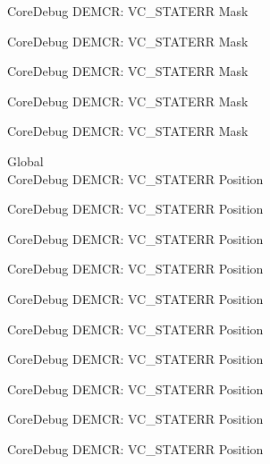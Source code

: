 \begin{DoxyRefList}
\label{deprecated__deprecated000884}%
%
Core\+Debug DEMCR\+: VC\+\_\+\+STATERR Mask 

\label{deprecated__deprecated001026}%
%
Core\+Debug DEMCR\+: VC\+\_\+\+STATERR Mask 

\label{deprecated__deprecated001102}%
%
Core\+Debug DEMCR\+: VC\+\_\+\+STATERR Mask 

\label{deprecated__deprecated001191}%
%
Core\+Debug DEMCR\+: VC\+\_\+\+STATERR Mask 

\label{deprecated__deprecated001293}%
%
Core\+Debug DEMCR\+: VC\+\_\+\+STATERR Mask  
\item[Global \doxylink{group___c_m_s_i_s___core_debug_ga16f0d3d2ce1e1e8cd762d938ac56c4ac}{Core\+Debug\+\_\+\+DEMCR\+\_\+\+VC\+\_\+\+STATERR\+\_\+\+Pos} ]\hfill \\
\label{deprecated__deprecated000061}%
%
Core\+Debug DEMCR\+: VC\+\_\+\+STATERR Position 

\label{deprecated__deprecated000205}%
%
Core\+Debug DEMCR\+: VC\+\_\+\+STATERR Position 

\label{deprecated__deprecated000347}%
%
Core\+Debug DEMCR\+: VC\+\_\+\+STATERR Position 

\label{deprecated__deprecated000423}%
%
Core\+Debug DEMCR\+: VC\+\_\+\+STATERR Position 

\label{deprecated__deprecated000512}%
%
Core\+Debug DEMCR\+: VC\+\_\+\+STATERR Position 

\label{deprecated__deprecated000614}%
%
Core\+Debug DEMCR\+: VC\+\_\+\+STATERR Position 

\label{deprecated__deprecated000739}%
%
Core\+Debug DEMCR\+: VC\+\_\+\+STATERR Position 

\label{deprecated__deprecated000883}%
%
Core\+Debug DEMCR\+: VC\+\_\+\+STATERR Position 

\label{deprecated__deprecated001025}%
%
Core\+Debug DEMCR\+: VC\+\_\+\+STATERR Position 

\label{deprecated__deprecated001101}%
%
Core\+Debug DEMCR\+: VC\+\_\+\+STATERR Position 


\end{DoxyRefList}
